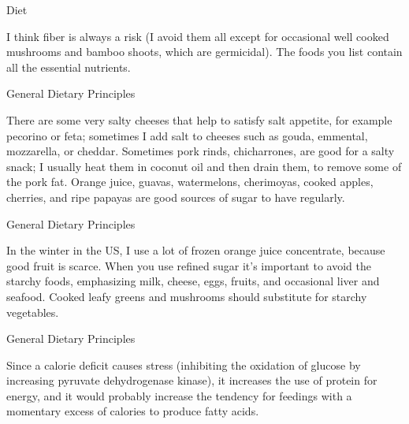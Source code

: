 \documentclass[11pt,oneside,openany,extrafontsizes]{memoir}
\begin{document}
\begin{standalonequote}{Diet}

    \begin{answer}
        I think fiber is always a risk (I avoid them all except for occasional well cooked mushrooms and bamboo shoots, which are germicidal). The foods you list contain all the essential nutrients.
    \end{answer}
\end{standalonequote}

\begin{standalonequote}{General Dietary Principles}

    \begin{answer}
      There are some very salty cheeses that help to satisfy salt appetite, for example pecorino or feta; sometimes I add salt to cheeses such as gouda, emmental, mozzarella, or cheddar. Sometimes pork rinds, chicharrones, are good for a salty snack; I usually heat them in coconut oil and then drain them, to remove some of the pork fat. Orange juice, guavas, watermelons, cherimoyas, cooked apples, cherries, and ripe papayas are good sources of sugar to have regularly.
    \end{answer}
\end{standalonequote}

\begin{standalonequote}{General Dietary Principles}

    \begin{answer}
       In the winter in the US, I use a lot of frozen orange juice concentrate, because good fruit is scarce. When you use refined sugar it's important to avoid the starchy foods, emphasizing milk, cheese, eggs, fruits, and occasional liver and seafood. Cooked leafy greens and mushrooms should substitute for starchy vegetables. 
    \end{answer}
\end{standalonequote}

\begin{standalonequote}{General Dietary Principles}

    \begin{answer}
      Since a calorie deficit causes stress (inhibiting the oxidation of glucose by increasing pyruvate dehydrogenase kinase), it increases the use of protein for energy, and it would probably increase the tendency for feedings with a momentary excess of calories to produce fatty acids.
    \end{answer}
\end{standalonequote}
\end{document}
